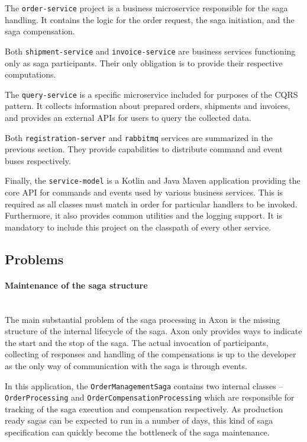 \documentclass[oneside,
  digital, %
  table,   %
  lof,     %
  lot,     %
]{fithesis3}
\newcommand{\newlinepar}[1]{\paragraph{#1}\needspace{3\baselineskip}\mbox{}\\}
\begin{document}
The \texttt{order-service} project is a business microservice responsible for the saga handling. It contains the logic for the order request, the saga initiation, and the saga compensation.

Both \texttt{shipment-service} and \texttt{invoice-service} are business services functioning only as saga participants. Their only obligation is to provide their respective computations.

The \texttt{query-service} is a specific microservice included for purposes of the CQRS pattern. It collects information about prepared orders, shipments and invoices, and provides an external APIs for users to query the collected data. 

Both \texttt{registration-server} and \texttt{rabbitmq} services are summarized in the previous section. They provide capabilities to distribute command and event buses respectively.

Finally, the \texttt{service-model} is a Kotlin and Java Maven application providing the core API for commands and events used by various business services. This is required as all classes must match in order for particular handlers to be invoked. Furthermore, it also provides common utilities and the logging support. It is mandatory to include this project on the classpath of every other service.

\subsection{Problems}
\label{sec:axon-problems}

\newlinepar{Maintenance of the saga structure}

The main substantial problem of the saga processing in Axon is the missing structure of the internal lifecycle of the saga. Axon only provides ways to indicate the start and the stop of the saga. The actual invocation of participants, collecting of responses and handling of the compensations is up to the developer as the only way of communication with the saga is through events.

In this application, the \texttt{OrderManagementSaga} contains two internal classes -- \texttt{OrderProcessing} and \texttt{OrderCompensationProcessing} which are responsible for tracking of the saga execution and compensation respectively. As production ready sagas can be expected to run in a number of days, this kind of saga specification can quickly become the bottleneck of the saga maintenance.
\end{document}
